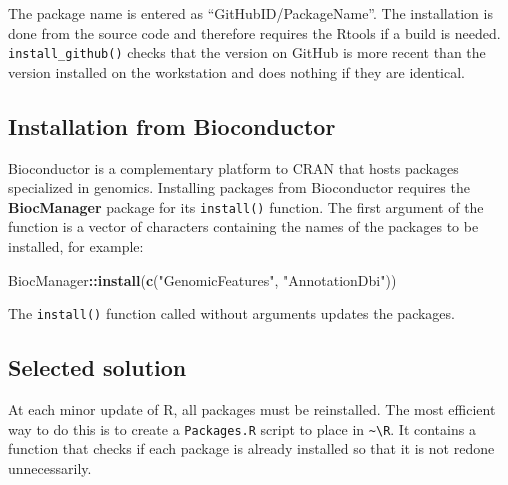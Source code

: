 \documentclass[
  12pt,
  american,
  a4paper,
  extrafontsizes,onecolumn,openright
  ]{memoir}
\newenvironment{Shaded}{\begin{snugshade}}{\end{snugshade}}
\newcommand{\FunctionTok}[1]{\textcolor[rgb]{0.13,0.29,0.53}{\textbf{#1}}}
\newcommand{\NormalTok}[1]{#1}
\newcommand{\SpecialCharTok}[1]{\textcolor[rgb]{0.81,0.36,0.00}{\textbf{#1}}}
\newcommand{\StringTok}[1]{\textcolor[rgb]{0.31,0.60,0.02}{#1}}
\begin{document}
The package name is entered as \enquote{GitHubID/PackageName}.
The installation is done from the source code and therefore requires the Rtools if a build is needed.
\texttt{install\_github()} checks that the version on GitHub is more recent than the version installed on the workstation and does nothing if they are identical.

\subsection{Installation from Bioconductor}\label{installation-from-bioconductor}

Bioconductor is a complementary platform to CRAN that hosts packages specialized in genomics.
Installing packages from Bioconductor requires the \textbf{BiocManager} package for its \texttt{install()} function.
The first argument of the function is a vector of characters containing the names of the packages to be installed, for example:

\scriptsize

\begin{Shaded}
\begin{Highlighting}[]
\NormalTok{BiocManager}\SpecialCharTok{::}\FunctionTok{install}\NormalTok{(}\FunctionTok{c}\NormalTok{(}\StringTok{"GenomicFeatures"}\NormalTok{, }\StringTok{"AnnotationDbi"}\NormalTok{))}
\end{Highlighting}
\end{Shaded}

\normalsize

The \texttt{install()} function called without arguments updates the packages.

\subsection{Selected solution}\label{selected-solution}

At each minor update of R, all packages must be reinstalled.
The most efficient way to do this is to create a \texttt{Packages.R} script to place in \texttt{\textasciitilde{}\textbackslash{}R}.
It contains a function that checks if each package is already installed so that it is not redone unnecessarily.

\scriptsize
\end{document}
